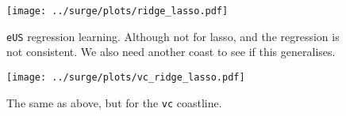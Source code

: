 \begin{figure}[htb!]
    \centering
    \texttt{[image: ../surge/plots/ridge\_lasso.pdf]}
    \vspace{-15pt}
   \caption{\texttt{eUS} regression learning.
    Although not for lasso, and the regression is not consistent.
            We also need another coast to see if this generalises.}
    \label{fig:learnt-eus}

    \centering
    \texttt{[image: ../surge/plots/vc\_ridge\_lasso.pdf]}
    \caption{The same as above, but for the \texttt{vc} coastline.}
    \label{fig:learnt-vc}
\end{figure}
